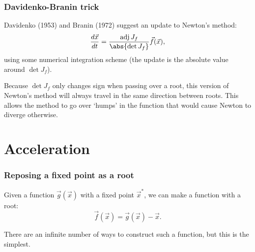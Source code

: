 \documentclass{beamer}
\DeclareMathOperator{\adj}{adj}
\begin{document}
\begin{frame}
\frametitle{Davidenko-Branin trick}

Davidenko (1953) and Branin (1972) suggest an update to Newton's method:
\begin{equation*}
	\frac{d \vec{x}}{dt} = \frac{ \adj J_f}{\abs{ \det J_f}} \vec{f}(\vec{x}),
\end{equation*}
using some numerical integration scheme (the update is the absolute value around $\det J_f$).

Because $\det J_f$ only changes sign when passing over a root, this version of Newton's method will always travel in the same direction between roots.
This allows the method to go over `humps' in the function that would cause Newton to diverge otherwise.

\end{frame}

\section{Acceleration}

\begin{frame}
\frametitle{Reposing a fixed point as a root}

Given a function $\vec{g}(\vec{x})$ with a fixed point $\vec{x}^*$, we can make a function with a root:
\begin{equation*}
	\vec{f}(\vec{x}) = \vec{g}(\vec{x}) - \vec{x}.
\end{equation*}

There are an infinite number of ways to construct such a function, but this is the simplest.

\end{frame}
\end{document}
